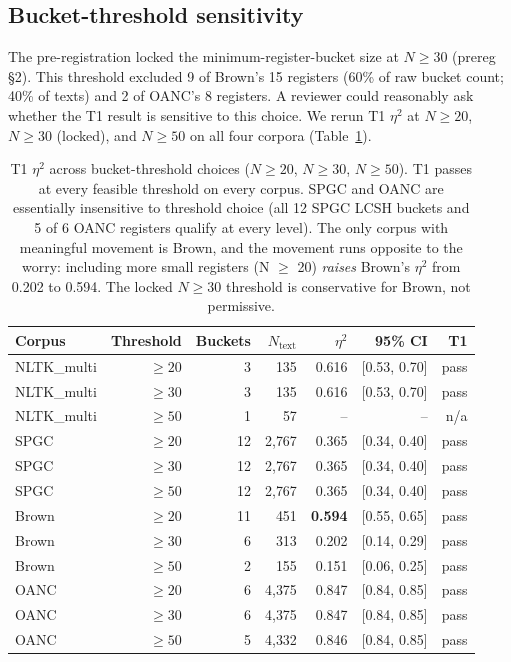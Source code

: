 \documentclass[11pt,a4paper]{article}
\begin{document}
\subsection{Bucket-threshold sensitivity}
\label{sec:bucket-sens}

The pre-registration locked the minimum-register-bucket size at
\(N \ge 30\) (prereg §2). This threshold excluded
9 of Brown's 15 registers (60\% of raw bucket count; 40\% of texts)
and 2 of OANC's 8 registers. A reviewer could reasonably ask whether
the T1 result is sensitive to this choice. We rerun T1 \(\eta^2\) at
\(N \ge 20\), \(N \ge 30\) (locked), and \(N \ge 50\) on all four
corpora (Table~\ref{tab:bucket-sens}).

\begin{table}[ht]
\centering
\small
\begin{tabular}{lrrrrrr}
\toprule
Corpus & Threshold & Buckets & $N_{\text{text}}$ & \(\eta^2\) & 95\% CI & T1 \\
\midrule
NLTK\_multi & \(\ge 20\) & 3  & 135  & 0.616 & [0.53, 0.70] & pass \\
NLTK\_multi & \(\ge 30\) & 3  & 135  & 0.616 & [0.53, 0.70] & pass \\
NLTK\_multi & \(\ge 50\) & 1  & 57   & --    & --           & n/a  \\
SPGC        & \(\ge 20\) & 12 & 2{,}767 & 0.365 & [0.34, 0.40] & pass \\
SPGC        & \(\ge 30\) & 12 & 2{,}767 & 0.365 & [0.34, 0.40] & pass \\
SPGC        & \(\ge 50\) & 12 & 2{,}767 & 0.365 & [0.34, 0.40] & pass \\
Brown       & \(\ge 20\) & 11 & 451  & \textbf{0.594} & [0.55, 0.65] & pass \\
Brown       & \(\ge 30\) & 6  & 313  & 0.202 & [0.14, 0.29] & pass \\
Brown       & \(\ge 50\) & 2  & 155  & 0.151 & [0.06, 0.25] & pass \\
OANC        & \(\ge 20\) & 6  & 4{,}375 & 0.847 & [0.84, 0.85] & pass \\
OANC        & \(\ge 30\) & 6  & 4{,}375 & 0.847 & [0.84, 0.85] & pass \\
OANC        & \(\ge 50\) & 5  & 4{,}332 & 0.846 & [0.84, 0.85] & pass \\
\bottomrule
\end{tabular}
\caption{T1 \(\eta^2\) across bucket-threshold choices (\(N \ge 20\),
\(N \ge 30\), \(N \ge 50\)). T1 passes at every feasible threshold on
every corpus. SPGC and OANC are essentially insensitive to threshold
choice (all 12 SPGC LCSH buckets and 5 of 6 OANC registers qualify at
every level). The only corpus with meaningful movement is Brown, and
the movement runs opposite to the worry: including more small registers
(N \(\ge\) 20) \emph{raises} Brown's \(\eta^2\) from 0.202 to 0.594.
The locked \(N \ge 30\) threshold is conservative for Brown, not
permissive.}
\label{tab:bucket-sens}
\end{table}
\end{document}
